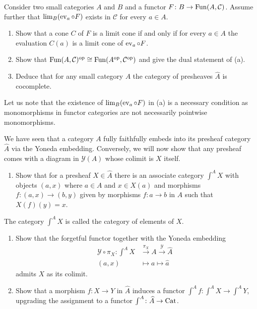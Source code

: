 \begin{Exercise}
	Consider two small categories $ A $ and $ B $ and a functor $ F \colon B  \to \operatorname{Fun} ( A , \mathcal{ C } )$. Assume further that $  \lim_B ( \operatorname{ev}_a \circ F ) $ exists in $ \mathcal{ C } $ for every $ a \in A$.
	\begin{enumerate}[label=(\alph*)]
		\item 
		Show that a cone $ C $ of $ F $ is a limit cone if and only if for every $ a \in A $ the evaluation $ C ( a ) $ is a limit cone of $ \operatorname{ev}_a \circ F $.
		
		\item 
		Show that $ \operatorname{Fun} ( A , \mathcal{ C } )^{ \operatorname{op} } \cong \operatorname{Fun} ( A^{\operatorname{op}}, \mathcal{ C }^{\operatorname{op}} ) $ and give the dual statement of (a).
		
		\item 
		Deduce that for any small category $ A $ the category of presheaves $ \widehat{ A } $ is cocomplete.
	\end{enumerate}  
	Let us note that the existence of $ \lim_B ( \operatorname{ev}_a \circ F ) $ in (a) is a necessary condition as monomorphisms in functor categories are not necessarily pointwise monomorphisms.
\end{Exercise}

\begin{Exercise}
	We have seen that a category $ A $ fully faithfully embeds into its presheaf category $ \widehat{ A }$ via the Yoneda embedding.
	Conversely, we will now show that any presheaf comes with a diagram in $ \mathcal{ Y } ( A ) $ whose colimit is $ X $ itself.
	
	\begin{enumerate}[label=(\alph*)]
		\item 
		Show that for a presheaf $ X \in \widehat{ A }$ there is an associate category $ \int^A X $ with objects $ ( a , x ) $ where $ a \in A $ and $ x \in X ( a ) $ and morphisms  $ f \colon ( a , x ) \to ( b ,y ) $ given by morphisms $ f \colon a \to b $ in $ A $ such that $ X ( f ) ( y ) = x $.
	\end{enumerate}
	
	The category $ \int^A X $ is called the category of elements of $ X $.
	
	\begin{enumerate}[label=(\alph*),resume]
		\item 
		Show that the forgetful functor together with the Yoneda embedding
		\begin{align*}
			\mathcal{ Y } \circ \pi_X \colon \int^A X &\xrightarrow{ \pi_X} A \xrightarrow{ \mathcal{ Y }} \widehat{ A }
			\\
			(a,x) &\mapsto a \mapsto \widehat{a}
		\end{align*}
		admits $ X $ as its colimit.
		
		\item 
		Show that a morphism $ f \colon X \to Y$ in $ \widehat{ A } $ induces a functor $ \int^A f \colon \int^A X \to \int^A Y $, upgrading the assignment to a functor $ \int^A \colon \widehat{ A } \to \operatorname{Cat}$.
	\end{enumerate}
\end{Exercise}

